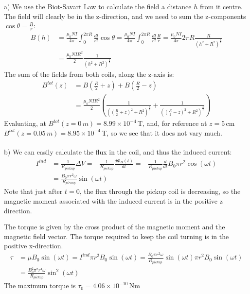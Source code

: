 \begin{solution}
a) We use the Biot-Savart Law to calculate the field a distance $h$ from it centre. The field will clearly be in the z-direction, and we need to sum the z-components $\cos\theta=\frac{R}{r}$:
\begin{align*}
B(h) &= \frac{\mu_0NI}{4\pi}\int_0^{2\pi R}\frac{dl}{r^2}\cos\theta=\frac{\mu_0NI}{4\pi}\int_0^{2\pi R}\frac{dl}{r^2}\frac{R}{r}=\frac{\mu_0NI}{4\pi}2\pi R\frac{R}{(h^2+R^2)^{\frac{3}{2}}}\\
&=\frac{\mu_0NIR^2}{2}\frac{1}{(h^2+R^2)^{\frac{3}{2}}}
\end{align*}
The sum of the fields from both coils, along the z-axis is:
\begin{align*}
B^{tot}(z) &= B(\frac{R}{2}+z)+B(\frac{R}{2}-z)\\
&=\frac{\mu_0NIR^2}{2} \left( \frac{1}{((\frac{R}{2}+z)^2+R^2)^{\frac{3}{2}}}+\frac{1}{((\frac{R}{2}-z)^2+R^2)^{\frac{3}{2}}}\right)
\end{align*}
Evaluating, at $B^{tot}(z=0\,m)=8.99\times 10^{-4}$\,T, and, for reference at $z=5$\,cm $B^{tot}(z=0.05\,m)=8.95\times 10^{-4}$\,T, so we see that it does not vary much.
\\
\\
b) We can easily calculate the flux in the coil, and thus the induced current:
\begin{align*}
I^{ind}&=\frac{1}{R_{pickup}}\Delta V=-\frac{1}{R_{pickup}}\frac{d\Phi_B(t)}{dt}=-\frac{1}{R_{pickup}}\frac{d}{dt}B_0\pi r^2\cos(\omega t)\\
&=\frac{B_0\pi r^2\omega}{R_{pickup}}\sin(\omega t)
\end{align*}
Note that just after $t=0$, the flux through the pickup coil is decreasing, so the magnetic moment associated with the induced current is in the positive z direction.

The torque is given by the cross product of the magnetic moment and the magnetic field vector. The torque required to keep the coil turning is in the positive x-direction.
\begin{align*}
\tau &= \mu B_0 \sin(\omega t) = I^{ind}\pi r^2 B_0  \sin(\omega t)= \frac{B_0\pi r^2\omega}{R_{pickup}}\sin(\omega t)\pi r^2 B_0  \sin(\omega t)\\
&=\frac{B_0^2\pi^2 r^4\omega}{R_{pickup}}\sin^2(\omega t)
\end{align*}
The maximum torque is $\tau_0=4.06\times 10^{-10}$\,Nm
\end{solution}
